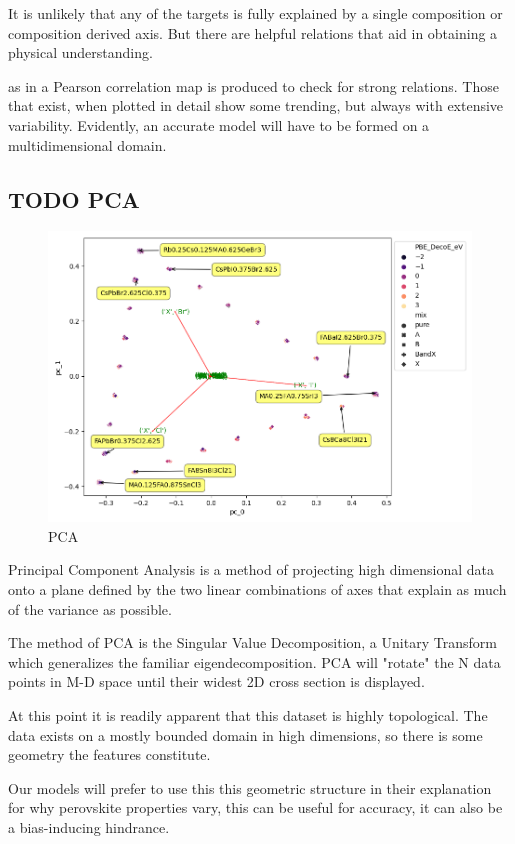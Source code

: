 \documentclass[twoside, twocolumn, 9pt, draft]{article}
\begin{document}
It is unlikely that any of the targets is fully explained by a single
composition or composition derived axis. But there are helpful relations
that aid in obtaining a physical understanding.

as in a Pearson correlation map is produced to check for strong
relations. Those that exist, when plotted in detail show some trending,
but always with extensive variability. Evidently, an accurate model will
have to be formed on a multidimensional domain.

\subsection*{{\bfseries\sffamily TODO} PCA}
\label{sec:org4cc7cdc}
\begin{figure}
\centering
\includegraphics[width=.9\linewidth]{comp_ratio_projection_annot.png}
\caption{\label{fig:pca} PCA}
\end{figure}

Principal Component Analysis is a method of projecting high dimensional
data onto a plane defined by the two linear combinations of axes that
explain as much of the variance as possible.

The method of PCA is the Singular Value Decomposition, a Unitary
Transform which generalizes the familiar eigendecomposition. PCA will
"rotate" the N data points in M-D space until their widest 2D cross
section is displayed.

At this point it is readily apparent that this dataset is highly
topological. The data exists on a mostly bounded domain in high
dimensions, so there is some geometry the features constitute.

Our models will prefer to use this this geometric structure in their
explanation for why perovskite properties vary, this can be useful for
accuracy, it can also be a bias-inducing hindrance.
\end{document}
